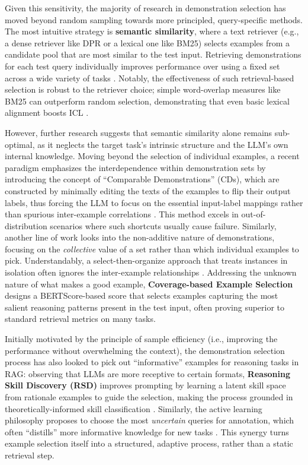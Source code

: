 \documentclass[11pt]{article}
\begin{document}
Given this sensitivity, the majority of research in demonstration selection has moved beyond random sampling towards more principled, query-specific methods. The most intuitive strategy is \textbf{semantic similarity}, where a text retriever (e.g., a dense retriever like DPR or a lexical one like BM25) selects examples from a candidate pool that are most similar to the test input. Retrieving demonstrations for each test query individually improves performance over using a fixed set across a wide variety of tasks \cite{ref127}. Notably, the effectiveness of such retrieval-based selection is robust to the retriever choice; simple word-overlap measures like BM25 can outperform random selection, demonstrating that even basic lexical alignment boosts ICL \cite{ref128}.

However, further research suggests that semantic similarity alone remains sub-optimal, as it neglects the target task's intrinsic structure and the LLM's own internal knowledge. Moving beyond the selection of individual examples, a recent paradigm emphasizes the interdependence within demonstration sets by introducing the concept of ``Comparable Demonstrations'' (CDs), which are constructed by minimally editing the texts of the examples to flip their output labels, thus forcing the LLM to focus on the essential input-label mappings rather than spurious inter-example correlations \cite{ref126}. This method excels in out-of-distribution scenarios where such shortcuts usually cause failure. Similarly, another line of work looks into the non-additive nature of demonstrations, focusing on the \emph{collective} value of a set rather than which individual examples to pick. Understandably, a select-then-organize approach that treats instances in isolation often ignores the inter-example relationships \cite{ref129}. Addressing the unknown nature of what makes a good example, \textbf{Coverage-based Example Selection} \cite{ref125} designs a BERTScore-based score that selects examples capturing the most salient reasoning patterns present in the test input, often proving superior to standard retrieval metrics on many tasks.

Initially motivated by the principle of sample efficiency (i.e., improving the performance without overwhelming the context), the demonstration selection process has also looked to pick out ``informative'' examples for reasoning tasks in RAG: observing that LLMs are more receptive to certain formats, \textbf{Reasoning Skill Discovery (RSD)} improves prompting by learning a latent skill space from rationale examples to guide the selection, making the process grounded in theoretically-informed skill classification \cite{ref130}. Similarly, the active learning philosophy proposes to choose the most \emph{uncertain} queries for annotation, which often ``distills'' more informative knowledge for new tasks \cite{ref131}. This synergy turns example selection itself into a structured, adaptive process, rather than a static retrieval step.
\end{document}
